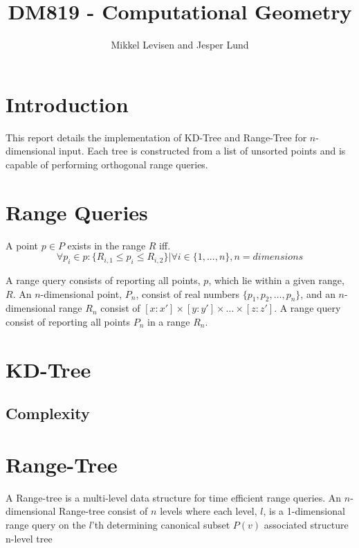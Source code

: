 \documentclass{article}
\newcommand{\subtitle}[1]{%
  \posttitle{%
    \par\end{center}
    \begin{center}\large#1\end{center}
    \vskip0.5em}%
}
\begin{document}
\title{DM819 - Computational Geometry}
\subtitle{Fall 2015\\Project 2}
\author{Mikkel Levisen and Jesper Lund}
\maketitle
\thispagestyle{empty}
\newpage
\tableofcontents
\thispagestyle{empty}
\newpage
\section{Introduction}
  This report details the implementation of KD-Tree and Range-Tree for 
  $n$-dimensional input. Each tree is constructed from a list of unsorted points
  and is capable of performing orthogonal range queries.
\section{Range Queries}

  A point $p \in P$ exists in the range $R$ iff.
  \[
    \forall p_i \in p: \{ R_{i,1}\leq   p_i \leq R_{i,2}\}|\forall i \in \{1,...,n\}, n = dimensions 
  \]

  A range query consists of reporting all points, $p$, which lie within a given 
  range, $R$.
  An $n$-dimensional point, $P_n$, consist of real numbers 
  $\{p_1,p_2,\dots,p_n\}$, and an $n$-dimensional range $R_n$ consist of 
  $[x:x']\times[y:y'] \times \dots \times[z:z']$. A range query consist of 
  reporting all points $P_n$ in a range $R_n$.
\section{KD-Tree}
\subsection{Complexity}
\section{Range-Tree}
  A Range-tree is a multi-level data structure for time efficient range queries.
  An $n$-dimensional Range-tree consist of $n$ levels where each level, $l$, is 
  a 1-dimensional range query on the $l$'th  
  determining 
  canonical subset $P(v)$
  associated structure
  n-level tree
\end{document}
